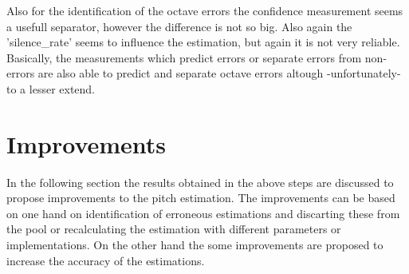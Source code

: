 \documentclass{proc}
\begin{document}
Also for the identification of the octave errors the confidence measurement seems a usefull separator, however the difference is not so big. Also again the 'silence\_rate' seems to influence the estimation, but again it is not very reliable. Basically, the measurements which predict errors or separate errors from non-errors are also able to predict and separate octave errors altough -unfortunately- to a lesser extend. 

\section{Improvements}
In the following section the results obtained in the above steps are discussed to propose improvements to the pitch estimation. The improvements can be based on one hand on identification of erroneous estimations and discarting these from the pool or recalculating the estimation with different parameters or implementations. On the other hand the some improvements are proposed to increase the accuracy of the estimations.
\end{document}
